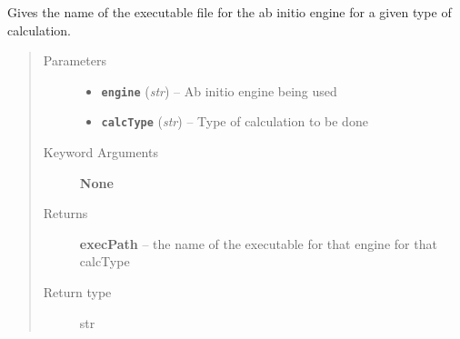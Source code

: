 \documentclass[letterpaper,10pt,english]{sphinxmanual}
\begin{document}
\begin{fulllineitems}
\label{run:run.__getEnginePath}
Gives the name of the executable file for the ab initio engine
for a given type of calculation.
\begin{quote}\begin{description}
\item[{Parameters}] \leavevmode\begin{itemize}
\item {} 
\textbf{\texttt{engine}} (\emph{str}) -- Ab initio engine being used

\item {} 
\textbf{\texttt{calcType}} (\emph{str}) -- Type of calculation to be done

\end{itemize}

\item[{Keyword Arguments}] \leavevmode
\textbf{None}

\item[{Returns}] \leavevmode
\textbf{execPath} --
the name of the executable for that engine for that calcType

\item[{Return type}] \leavevmode
str

\end{description}\end{quote}

\end{fulllineitems}

\end{document}
